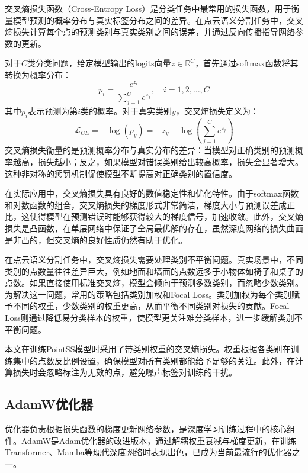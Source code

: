 \documentclass[12pt,a4paper,openany,oneside]{ctexbook}
\theoremstyle{definition}
\theoremstyle{remark}
\begin{document}
交叉熵损失函数（Cross-Entropy Loss）是分类任务中最常用的损失函数，用于衡量模型预测的概率分布与真实标签分布之间的差异。在点云语义分割任务中，交叉熵损失计算每个点的预测类别与真实类别之间的误差，并通过反向传播指导网络参数的更新。

对于$C$类分类问题，给定模型输出的logits向量$z \in \mathbb{R}^C$，首先通过softmax函数将其转换为概率分布：
\begin{equation}
p_i = \frac{e^{z_i}}{\sum_{j=1}^{C} e^{z_j}}, \quad i = 1, 2, \ldots, C
\end{equation}
其中$p_i$表示预测为第$i$类的概率。对于真实类别$y$，交叉熵损失定义为：
\begin{equation}
\mathcal{L}_{CE} = -\log(p_y) = -z_y + \log\left(\sum_{j=1}^{C} e^{z_j}\right)
\end{equation}
交叉熵损失衡量的是预测概率分布与真实分布的差异：当模型对正确类别的预测概率越高，损失越小；反之，如果模型对错误类别给出较高概率，损失会显著增大。这种非对称的惩罚机制促使模型不断提高对正确类别的置信度。

在实际应用中，交叉熵损失具有良好的数值稳定性和优化特性。由于softmax函数和对数函数的组合，交叉熵损失的梯度形式非常简洁，梯度大小与预测误差成正比，这使得模型在预测错误时能够获得较大的梯度信号，加速收敛。此外，交叉熵损失是凸函数，在单层网络中保证了全局最优解的存在，虽然深度网络的损失曲面是非凸的，但交叉熵的良好性质仍然有助于优化。

在点云语义分割任务中，交叉熵损失需要处理类别不平衡问题。真实场景中，不同类别的点数量往往差异巨大，例如地面和墙面的点数远多于小物体如椅子和桌子的点数。如果直接使用标准交叉熵，模型会倾向于预测多数类别，而忽略少数类别。为解决这一问题，常用的策略包括类别加权和Focal Loss。类别加权为每个类别赋予不同的权重，少数类别的权重更高，从而平衡不同类别对损失的贡献。Focal Loss则通过降低易分类样本的权重，使模型更关注难分类样本，进一步缓解类别不平衡问题。

本文在训练PointSS模型时采用了带类别权重的交叉熵损失。权重根据各类别在训练集中的点数反比例设置，确保模型对所有类别都能给予足够的关注。此外，在计算损失时会忽略标注为无效的点，避免噪声标签对训练的干扰。

\subsection{AdamW优化器}

优化器负责根据损失函数的梯度更新网络参数，是深度学习训练过程中的核心组件。AdamW\cite{loshchilov2018decoupled}是Adam优化器的改进版本，通过解耦权重衰减与梯度更新，在训练Transformer、Mamba等现代深度网络时表现出色，已成为当前最流行的优化器之一。
\end{document}
